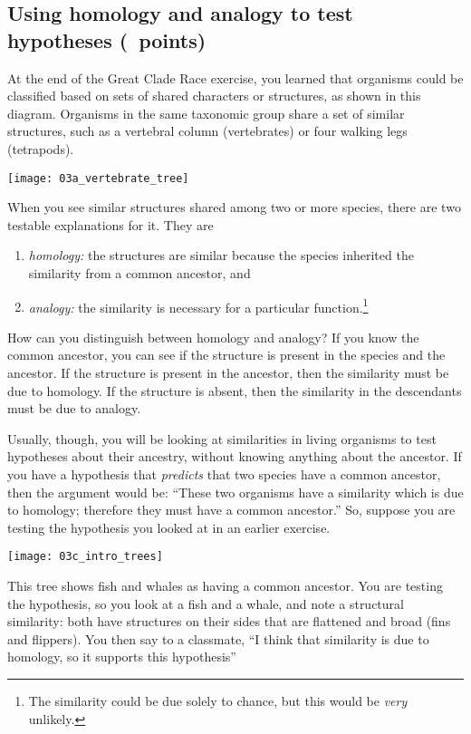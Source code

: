 \documentclass[12pt, addpoints, hidelinks]{exam}
\begin{document}
\subsection*{Using homology and analogy to test hypotheses (\numpoints\ points)}

At the end of the Great Clade Race exercise, you learned that organisms could
be classified based on sets of shared characters or structures, as shown in this 
diagram. Organisms in the same taxonomic group share a set of similar structures,
such as a vertebral column (vertebrates) or four walking legs (tetrapods).

\noindent\texttt{[image: 03a\_vertebrate\_tree]}

When you see similar structures shared among two or more species, there are two
testable explanations for it. They are

\begin{enumerate}
	\item \emph{homology:} the structures are similar because the species
inherited the similarity from a common ancestor, and

	\item \emph{analogy:} the similarity is necessary for a particular function.\footnote{The similarity
could be due solely to chance, but this would be \emph{very}
unlikely.} 
\end{enumerate}

How can you distinguish between homology and analogy? If you know the 
common ancestor, you can see if the structure is present in the species and the
ancestor. If the structure is present in the ancestor, then the similarity must be due
to homology. If the structure is absent, then the similarity in the descendants must be due to analogy.

Usually, though, you will be looking at similarities in living organisms to test
hypotheses about their ancestry, without knowing anything about the ancestor.  
If you have a hypothesis that \emph{predicts} that two species have a
common ancestor, then the argument would be: ``These two organisms have a 
similarity which is due to homology; therefore they must have a common ancestor.''
So, suppose you are testing the hypothesis you looked at in an earlier exercise.

\texttt{[image: 03c\_intro\_trees]}

This tree shows fish and whales as having a common ancestor.
You are testing the hypothesis, so you look at a fish and a whale,
and note a structural similarity: both have structures on their sides that are flattened
and broad (fins and flippers). You then say to a classmate, ``I think
that similarity is due to homology, so it supports this hypothesis''
\end{document}
